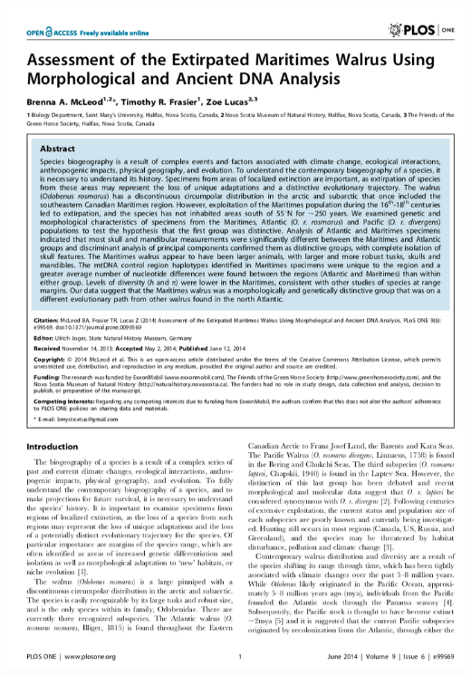 \documentclass[10pt]{beamer}
\begin{document}
\begin{frame}
	\begin{columns}
		\begin{column}{0.5\textwidth}
			\begin{center}
				\includegraphics[width=1.0\textwidth]{figures/paper1.png}
			\end{center}
		\end{column}
		

\end{columns}
\end{frame}
\end{document}
